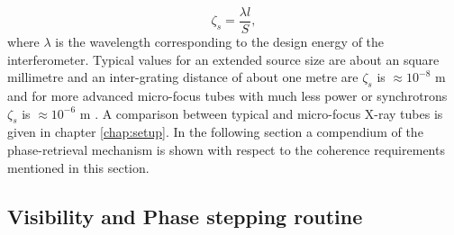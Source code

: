 \begin{equation}\label{cohlength}
\zeta_{s} = \frac{\lambda l}{S}, 
\end{equation}
where $\lambda$ is the wavelength corresponding to the design energy of the interferometer. Typical values for an extended source size are about an square millimetre and an inter-grating distance of about one metre are $\zeta_{s}$ is $\approx 10^{-8}$ m and for more advanced micro-focus tubes with much less power or synchrotrons $\zeta_{s}$ is $\approx 10^{-6}$ m  \citep{Pfeiffer2006}. A comparison between typical and micro-focus X-ray tubes is given in chapter \ref{chap:setup}. In the following section a compendium of the phase-retrieval mechanism is shown with respect to the coherence requirements mentioned in this section.          
\subsection{Visibility and Phase stepping routine}\label{subsec:stepp}
